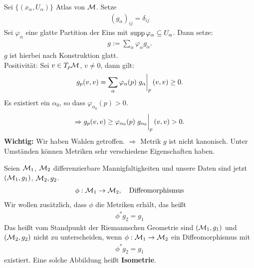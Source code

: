 \begin{bew}
Sei $\{ (x_\alpha, U_\alpha) \}$ Atlas von $\mathcal{M}$.
Setze
\begin{align*}
(g_\alpha)_{ij} = \delta_{ij}
\end{align*}
Sei $\varphi_\alpha$ eine glatte Partition der Eins mit $\operatorname{supp} \varphi_\alpha \subseteq U_\alpha$.
Dann setze:
\begin{align*}
g := \sum_\alpha \varphi_\alpha g_\alpha.
\end{align*}
$g$ ist hierbei nach Konstruktion glatt.\\
Positivität: Sei $v \in T_p \mathcal{M}$, $v \neq 0$, dann gilt:
\begin{align*}
g_p (v, v) = \sum_\alpha \varphi_\alpha (p) \eval{g_\alpha}_p (v, v) \geq 0.
\end{align*}
Es existiert ein $\alpha_0$, so dass $\varphi_{\alpha_0}(p) > 0$.
\begin{align*}
\Rightarrow g_p (v, v) \geq \varphi_{\alpha_0} (p) \eval{g_{\alpha_0}}_p (v, v) > 0.
\end{align*} 
\textbf{Wichtig:} Wir haben Wahlen getroffen. 
$\Rightarrow$ Metrik $g$ ist nicht kanonisch.
Unter Umständen können Metriken sehr verschiedene Eigenschaften haben.
\end{bew}

Seien $\mathcal{M}_1$, $\mathcal{M}_2$ differenzierbare Mannigfaltigkeiten und unsere Daten sind jetzt $(\mathcal{M}_1, g_1)$, $\mathcal{M}_2, g_2$.
\begin{align*}
\phi : \mathcal{M}_1 \to \mathcal{M}_2, \quad \text{Diffeomorphismus}
\end{align*}
Wir wollen zusätzlich, dass $\phi$ die Metriken erhält, das heißt
\begin{align}
\phi^{\ast} g_2 = g_1
\end{align}
Das heißt vom Standpunkt der Riemannschen Geometrie sind $(\mathcal{M}_1, g_1)$ und $(\mathcal{M}_2, g_2)$ nicht zu unterscheiden,
wenn $\phi: \mathcal{M}_1 \to \mathcal{M}_2$ ein Diffeomorphismus mit
\begin{align}
\phi^\ast g_2 = g_1
\end{align}
existiert.
Eine solche Abbildung heißt \textbf{Isometrie}.\\


